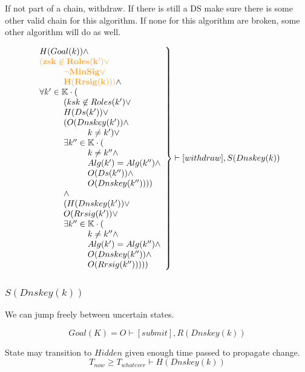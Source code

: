 \documentclass[twoside,english, a4paper]{article}
\newcommand{\highlightMinSig}[1]{\textcolor{MinSig}{\bf{#1}}}
\newcommand{\mathbox}[1]{#1}
\begin{document}
\mathbox{

	If not part of a chain, withdraw. If there is still a DS make sure 
	there is some other valid chain for this algorithm. If none for 
	this algorithm are broken, some other algorithm will do as well.
	
	\begin{equation}
		\left.
		\begin{array}{l}
			H(Goal(k)) \wedge \\
\highlightMinSig{\hskip 0cm	(zsk \not \in Roles(k') \vee }\\
\highlightMinSig{\hskip 1cm		\neg MinSig \vee }\\
\highlightMinSig{\hskip 1cm		H(Rrsig(k)))} \wedge \\

\hskip 0cm	\forall k' \in \mathbb{K} \cdot (\\
\hskip 1cm		(ksk \not \in Roles(k') \vee\\
\hskip 1cm		H(Ds(k')) \vee \\
\hskip 1cm		(O(Dnskey(k')) \wedge \\
\hskip 2cm			k \neq k') \vee \\
\hskip 1cm		\exists k'' \in \mathbb{K} \cdot (\\
\hskip 2cm			k \neq k'' \wedge \\
\hskip 2cm			Alg(k')=Alg(k'') \wedge \\
\hskip 2cm			O(Ds(k'')) \wedge \\
\hskip 2cm			O(Dnskey(k'')))) \\
\hskip 1cm		\wedge \\
\hskip 1cm		(H(Dnskey(k')) \vee \\
\hskip 1cm		O(Rrsig(k'))  \vee \\
\hskip 1cm		\exists k'' \in \mathbb{K} \cdot (\\
\hskip 2cm			k \neq k'' \wedge \\
\hskip 2cm			Alg(k')=Alg(k'') \wedge \\
\hskip 2cm			O(Dnskey(k'')) \wedge \\
\hskip 2cm			O(Rrsig(k'')))))
		\end{array}
		\right\} \vdash [withdraw], S(Dnskey(k))
	\end{equation}
}

\subsubsection{$S(Dnskey(k))$}

\mathbox{

	We can jump freely between uncertain states.

	\begin{equation}
			Goal(K)=O \vdash [submit], R(Dnskey(k))
	\end{equation}

	State may transition to $Hidden$ given enough time passed to propagate 
	change. 
	\begin{equation}
			T_{now} \geq T_{whatever} \vdash H(Dnskey(k))
	\end{equation}
}
\end{document}
